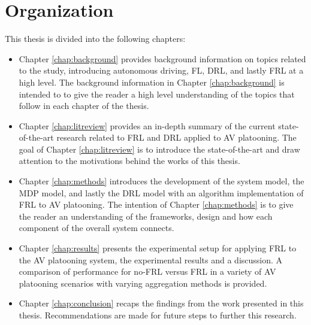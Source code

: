 \section{Organization}
This thesis is divided into the following chapters:

\begin{itemize}
    \item Chapter \ref{chap:background} provides background information on
    topics related to the study, introducing autonomous driving, FL, DRL,
    and lastly FRL at a high level. The background information in Chapter
    \ref{chap:background} is intended to to give the reader a high level
    understanding of the topics that follow in each
    chapter of the thesis.
    \vspace{12pt}
    \item Chapter \ref{chap:litreview} provides an in-depth summary of
    the current state-of-the-art research related to FRL and DRL applied
    to AV platooning. The goal of Chapter \ref{chap:litreview} is to
    introduce the state-of-the-art and draw attention to the motivations
    behind the works of this thesis.
    \vspace{12pt}
    \item Chapter \ref{chap:methods} introduces the development of the
    system model, the MDP model, and lastly the DRL model with an
    algorithm implementation of FRL to AV platooning.  The intention of
    Chapter \ref{chap:methods} is to give the reader an understanding of
    the frameworks, design and how each component of the overall system
    connects.
    \vspace{12pt}
    \item Chapter \ref{chap:results} presents the experimental
    setup for applying FRL to the AV platooning system, the
    experimental results and a discussion. A comparison of performance for
    no-FRL versus FRL in a variety of AV platooning scenarios with varying
    aggregation methods is provided.
    \vspace{12pt}
    \item Chapter \ref{chap:conclusion} recaps the findings
    from the work presented in this thesis. Recommendations
    are made for future steps to further this research.
\end{itemize}


